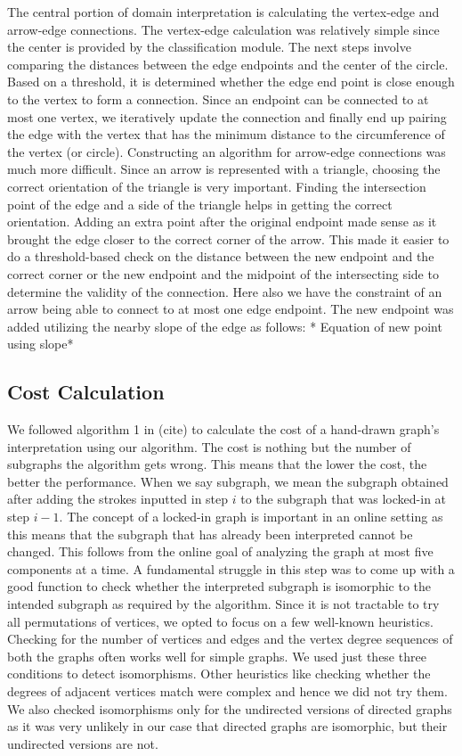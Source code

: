The central portion of domain interpretation is calculating the vertex-edge and arrow-edge connections. The vertex-edge calculation was relatively simple since the center is provided by the classification module. The next steps involve comparing the distances between the edge endpoints and the center of the circle. Based on a threshold, it is determined whether the edge end point is close enough to the vertex to form a connection. Since an endpoint can be connected to at most one vertex, we iteratively update the connection and finally end up pairing the edge with the vertex that has the minimum distance to the circumference of the vertex (or circle). Constructing an algorithm for arrow-edge connections was much more difficult. Since an arrow is represented with a triangle, choosing the correct orientation of the triangle is very important. Finding the intersection point of the edge and a side of the triangle helps in getting the correct orientation. Adding an extra point after the original endpoint made sense as it brought the edge closer to the correct corner of the arrow. This made it easier to do a threshold-based check on the distance between the new endpoint and the correct corner or the new endpoint and the midpoint of the intersecting side to determine the validity of the connection. Here also we have the constraint of an arrow being able to connect to at most one edge endpoint. The new endpoint was added utilizing the nearby slope of the edge as follows: * Equation of new point using slope*

\subsection{Cost Calculation}

We followed algorithm 1 in (cite) to calculate the cost of a hand-drawn graph's interpretation using our algorithm. The cost is nothing but the number of subgraphs the algorithm gets wrong. This means that the lower the cost, the better the performance. When we say subgraph, we mean the subgraph obtained after adding the strokes inputted in step $i$ to the subgraph that was locked-in at step $i-1$. The concept of a locked-in graph is important in an online setting as this means that the subgraph that has already been interpreted cannot be changed. This follows from the online goal of analyzing the graph at most five components at a time. A fundamental struggle in this step was to come up with a good function to check whether the interpreted subgraph is isomorphic to the intended subgraph as required by the algorithm. Since it is not tractable to try all permutations of vertices, we opted to focus on a few well-known heuristics. Checking for the number of vertices and edges and the vertex degree sequences of both the graphs often works well for simple graphs. We used just these three conditions to detect isomorphisms. Other heuristics like checking whether the degrees of adjacent vertices match were complex and hence we did not try them. We also checked isomorphisms only for the undirected versions of directed graphs as it was very unlikely in our case that directed graphs are isomorphic, but their undirected versions are not.\\

